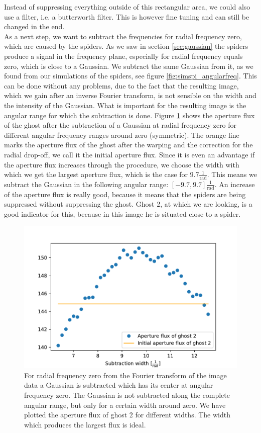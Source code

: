 Instead of suppressing everything outside of this rectangular area, we could also use a filter, i.e. a butterworth filter. This is however fine tuning and can still be changed in the end.\\
As a next step, we want to subtract the frequencies for radial frequency zero, which are caused by the spiders. As we saw in section \ref{sec:gaussian} the spiders produce a signal in the frequency plane, especially for radial frequency equals zero, which is close to a Gaussian. We subtract the same Gaussian from it, as we found from our simulations of the spiders, see figure \ref{fig:simspi_angularfreq}. This can be done without any problems, due to the fact that the resulting image, which we gain after an inverse Fourier transform, is not sensible on the width and the intensity of the Gaussian. What is important for the resulting image is the angular range for which the subtraction is done. Figure \ref{fig:rad0_diffsubwidths} shows the aperture flux of the ghost after the subtraction of a Gaussian at radial frequency zero for different angular frequency ranges around zero (symmetric). The orange line marks the aperture flux of the ghost after the warping and the correction for the radial drop-off, we call it the initial aperture flux. Since it is even an advantage if the aperture flux increases through the procedure, we choose the width with which we get the largest aperture flux, which is the case for $9.7 \frac{1}{\mathrm{rad}}$. This means we subtract the Gaussian in the following angular range: $[-9.7, 9.7] \frac{1}{\mathrm{rad}}$. An increase of the aperture flux is really good, because it means that the spiders are being suppressed without suppressing the ghost. Ghost 2, at which we are looking, is a good indicator for this, because in this image he is situated close to a spider.
\begin{figure}[H]
	\centering
		\includegraphics[width=1.0\textwidth]{pics/rad0_diffsubwidths.pdf}
		\caption{For radial frequency zero from the Fourier transform of the image data a Gaussian is subtracted which has its center at angular frequency zero. The Gaussian is not subtracted along the complete angular range, but only for a certain width around zero. We have plotted the aperture flux of ghost 2 for different widths. The width which produces the largest flux is ideal.}
		\label{fig:rad0_diffsubwidths}
\end{figure}
